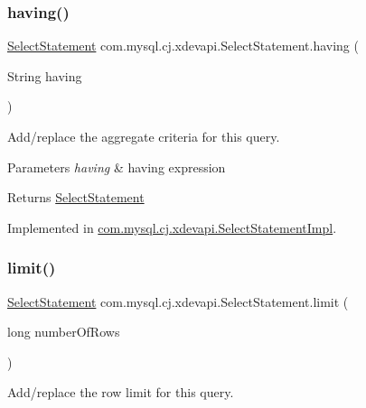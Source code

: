 \subsubsection{\texorpdfstring{having()}{having()}}
{\footnotesize\ttfamily \mbox{\hyperlink{interfacecom_1_1mysql_1_1cj_1_1xdevapi_1_1_select_statement}{Select\+Statement}} com.\+mysql.\+cj.\+xdevapi.\+Select\+Statement.\+having (\begin{DoxyParamCaption}\item[{String}]{having }\end{DoxyParamCaption})}

Add/replace the aggregate criteria for this query.


\begin{DoxyParams}{Parameters}
{\em having} & having expression \\
\hline
\end{DoxyParams}
\begin{DoxyReturn}{Returns}
\mbox{\hyperlink{interfacecom_1_1mysql_1_1cj_1_1xdevapi_1_1_select_statement}{Select\+Statement}} 
\end{DoxyReturn}


Implemented in \mbox{\hyperlink{classcom_1_1mysql_1_1cj_1_1xdevapi_1_1_select_statement_impl_a7c95308255a21648ee6bbe698e934552}{com.\+mysql.\+cj.\+xdevapi.\+Select\+Statement\+Impl}}.

\mbox{\label{interfacecom_1_1mysql_1_1cj_1_1xdevapi_1_1_select_statement_a434d35e15b13407d7a67df13c5c0d0f9}} 
\subsubsection{\texorpdfstring{limit()}{limit()}}
{\footnotesize\ttfamily \mbox{\hyperlink{interfacecom_1_1mysql_1_1cj_1_1xdevapi_1_1_select_statement}{Select\+Statement}} com.\+mysql.\+cj.\+xdevapi.\+Select\+Statement.\+limit (\begin{DoxyParamCaption}\item[{long}]{number\+Of\+Rows }\end{DoxyParamCaption})}

Add/replace the row limit for this query.


